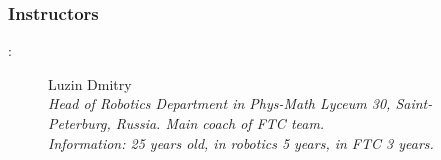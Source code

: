 \subsubsection{Instructors}:

\begin{figure}[H]
	
	\begin{minipage}[h]{0.47\linewidth}
		Luzin Dmitry\\
		\emph{Head of Robotics Department in Phys-Math Lyceum 30, Saint-Peterburg, Russia. Main coach of FTC team.\\}
		\emph{Information: 25 years old, in robotics 5 years, in FTC 3 years.}
	\end{minipage}
	\hfill
	\begin{minipage}{0.47\linewidth}
		\\
	\end{minipage}
	\vfill
	\begin{minipage}[h]{0.47\linewidth}

\end{minipage}
\end{figure}
